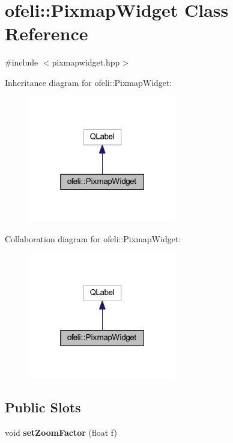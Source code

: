 \hypertarget{classofeli_1_1_pixmap_widget}{\section{ofeli\-:\-:Pixmap\-Widget Class Reference}
\label{classofeli_1_1_pixmap_widget}
}


{\ttfamily \#include $<$pixmapwidget.\-hpp$>$}



Inheritance diagram for ofeli\-:\-:Pixmap\-Widget\-:\nopagebreak
\begin{figure}[H]
\begin{center}
\leavevmode
\includegraphics[width=184pt]{classofeli_1_1_pixmap_widget__inherit__graph}
\end{center}
\end{figure}


Collaboration diagram for ofeli\-:\-:Pixmap\-Widget\-:\nopagebreak
\begin{figure}[H]
\begin{center}
\leavevmode
\includegraphics[width=184pt]{classofeli_1_1_pixmap_widget__coll__graph}
\end{center}
\end{figure}
\subsection*{Public Slots}
\begin{DoxyCompactItemize}
\item 
\hypertarget{classofeli_1_1_pixmap_widget_ae245448eabde60edd6d4543da56ae11b}{void {\bfseries set\-Zoom\-Factor} (float f)}\label{classofeli_1_1_pixmap_widget_ae245448eabde60edd6d4543da56ae11b}

\end{DoxyCompactItemize}
